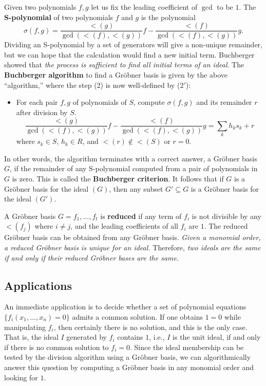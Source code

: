 Given two polynomials $f,g$ let us fix the leading coefficient of $\gcd$ to be $1$.
The {\bf S-polynomial} of two polynomials $f$ and $g$ is the polynomial
\[
 \sigma(f,g) = \frac{\lt(g)}{\gcd(\lt(f),\lt(g))} f - \frac{\lt(f)}{\gcd(\lt(f),\lt(g))} g .
\]
Dividing an S-polynomial by a set of generators will give a non-unique remainder,
but we can hope that the calculation would find a new initial term.
Buchberger showed that {\em the process is sufficient to find all initial terms of an ideal}.
The {\bf Buchberger algorithm} to find a Gr\"obner basis is given by the above ``algorithm,''
where the step (2) is now well-defined by (2$'$):
\begin{itemize}
 \item [(2$'$)] For each pair $f,g$ of polynomials of $S$, compute $\sigma(f,g)$ and its remainder $r$ after division by $S$.
\[
\frac{\lt(g)}{\gcd(\lt(f),\lt(g))} f - \frac{\lt(f)}{\gcd(\lt(f),\lt(g))} g = \sum_k h_k s_k  + r
\]
where $s_k \in S$, $h_k \in R$, and $\lt(r) \notin \lt(S)$ or $r=0$.
\end{itemize}
In other words, the algorithm terminates with a correct answer, a Gr\"obner basis $G$,
if the remainder of any S-polynomial computed from a pair of polynomials in $G$ is zero.
This is called the {\bf Buchberger criterion}.
It follows that if $G$ is a Gr\"obner basis for the ideal $(G)$,
then any subset $G' \subseteq G$ is a Gr\"obner basis for the ideal $(G')$.



A Gr\"obner basis $G={f_1,\ldots,f_t}$ is {\bf reduced}
if any term of $f_i$ is not divisible by any $\lt(f_j)$ where $i \neq j$,
and the leading coefficients of all $f_i$ are $1$.
The reduced Gr\"obner basis can be obtained from any Gr\"obner basis.
{\em Given a monomial order, a reduced Gr\"obner basis is unique for an ideal.}
Therefore, {\em two ideals are the same if and only if their reduced Gr\"obner bases are the same.}


\subsection*{Applications}

An immediate application is to decide whether 
a set of polynomial equations $\{f_i(x_1,\ldots,x_n) = 0 \}$ admits a common solution.
If one obtains $1 = 0$ while manipulating $f_i$, then certainly there is no solution,
and this is the only case. That is, the ideal $I$ generated by $f_i$ contains $1$,
i.e., $I$ is the unit ideal,
if and only if there is no common solution to $f_i = 0$.
Since the ideal membership can be tested by the division algorithm using a Gr\"obner basis,
we can algorithmically answer this question by computing a Gr\"obner basis
in any monomial order and looking for $1$.

